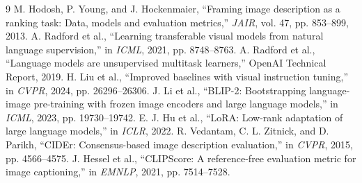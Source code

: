 \documentclass[conference]{IEEEtran}
\begin{document}
\begin{thebibliography}{9}
 M. Hodosh, P. Young, and J. Hockenmaier, ``Framing image description as a ranking task: Data, models and evaluation metrics,'' \textit{JAIR}, vol. 47, pp. 853--899, 2013.
 A. Radford et al., ``Learning transferable visual models from natural language supervision,'' in \textit{ICML}, 2021, pp. 8748--8763.
 A. Radford et al., ``Language models are unsupervised multitask learners,'' OpenAI Technical Report, 2019.
 H. Liu et al., ``Improved baselines with visual instruction tuning,'' in \textit{CVPR}, 2024, pp. 26296--26306.
 J. Li et al., ``BLIP-2: Bootstrapping language-image pre-training with frozen image encoders and large language models,'' in \textit{ICML}, 2023, pp. 19730--19742.
 E. J. Hu et al., ``LoRA: Low-rank adaptation of large language models,'' in \textit{ICLR}, 2022.
 R. Vedantam, C. L. Zitnick, and D. Parikh, ``CIDEr: Consensus-based image description evaluation,'' in \textit{CVPR}, 2015, pp. 4566--4575.
 J. Hessel et al., ``CLIPScore: A reference-free evaluation metric for image captioning,'' in \textit{EMNLP}, 2021, pp. 7514--7528.
\end{thebibliography}
\end{document}
